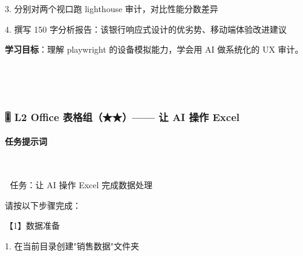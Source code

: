 \documentclass[
  american,
  chinese,
]{ctexart}
\begin{document}
\foreignlanguage{american}{3. }{分别对两个视口跑}\foreignlanguage{american}{ lighthouse }{审计，对比性能分数差异}\foreignlanguage{american}{}

\foreignlanguage{american}{4. }{撰写}\foreignlanguage{american}{ 150 }{字分析报告：该银行响应式设计的优劣势、移动端体验改进建议}\foreignlanguage{american}{}

\textbf{{学习目标}}{：理解}\foreignlanguage{american}{ playwright }{的设备模拟能力，学会用}\foreignlanguage{american}{ AI }{做系统化的}\foreignlanguage{american}{ UX }{审计。}\foreignlanguage{american}{}

\foreignlanguage{american}{\hfill\break
}

\foreignlanguage{american}{}

~

\foreignlanguage{american}{}

~

\subsubsection{\texorpdfstring{\foreignlanguage{american}{🎚️ L2 Office }{\foreignlanguage{american}{表格组}}\foreignlanguage{american}{（}\foreignlanguage{american}{★★}\foreignlanguage{american}{）}\foreignlanguage{american}{------
}\foreignlanguage{american}{让}\foreignlanguage{american}{ AI }{\foreignlanguage{american}{操作}}\foreignlanguage{american}{ Excel}}{🎚️ L2 Office 表格组（★★）------ 让 AI 操作 Excel}}\label{l2-office-ux8868ux683cux7ec4-ux8ba9-ai-ux64cdux4f5c-excel}

\paragraph{\texorpdfstring{{任务提示词}\foreignlanguage{american}{}}{任务提示词}}\label{ux4efbux52a1ux63d0ux793aux8bcd}

\foreignlanguage{american}{}

~

\foreignlanguage{american}{🎯}\foreignlanguage{american}{ }{任务：让}\foreignlanguage{american}{ AI }{操作}\foreignlanguage{american}{ Excel }{完成数据处理}\foreignlanguage{american}{}

{请按以下步骤完成：}\foreignlanguage{american}{}

{【}\foreignlanguage{american}{1}{】数据准备}\foreignlanguage{american}{}

\foreignlanguage{american}{1. }{在当前目录创建}\foreignlanguage{american}{"}{销售数据}\foreignlanguage{american}{"}{文件夹}\foreignlanguage{american}{}
\end{document}
